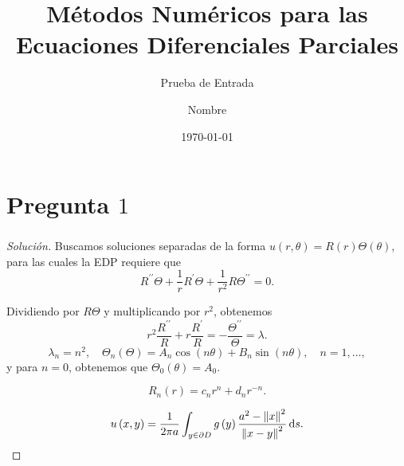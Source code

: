 \documentclass[aspectratio=1610,spanish,8pt]{beamer}
\title{Métodos Numéricos para las Ecuaciones Diferenciales Parciales} %
\subtitle{Prueba de Entrada}
\author{Nombre}
\institute{Universidad Nacional de Ingeniería}
\date{\today}
\begin{document}
\frame{\maketitle}

\section{Pregunta $1$}

\begin{frame}
    \frametitle{\secname}
    
\end{frame}

\begin{frame}
    \frametitle{\secname}

    \begin{proof}[Solución]
        Buscamos soluciones separadas de la forma
        \begin{math}
            u\left(r,\theta\right)=
            R\left(r\right)
            \Theta\left(\theta\right)
        \end{math},
        para las cuales la EDP requiere que
        \begin{equation*}
            R^{\prime\prime}\Theta+
            \frac{1}{r}
            R^{\prime}
            \Theta+
            \frac{1}{r^{2}}
            R\Theta^{\prime\prime}=
            0.
        \end{equation*}

        Dividiendo por $R\Theta$ y multiplicando por $r^{2}$,
        obtenemos
        \begin{equation*}
            r^{2}
            \frac{R^{\prime\prime}}{R}+
            r\frac{R^{\prime}}{R}=
            -\frac{\Theta^{\prime\prime}}{\Theta}=
            \lambda.
        \end{equation*}
        \begin{equation*}
            \lambda_{n}=n^{2},\quad
            \Theta_{n}\left(\Theta\right)=
            A_{n}
            \cos\left(n\theta\right)+
            B_{n}\sin\left(n\theta\right),\quad
            n=1,\dotsc,
        \end{equation*}
        y para $n=0$, obtenemos que $\Theta_{0}\left(\theta\right)=A_{0}$.

        \begin{equation*}
            R_{n}\left(r\right)=
            c_{n}r^{n}+
            d_{n}r^{-n}.
        \end{equation*}

        \begin{equation*}
            u\left(x,y\right)=
            \frac{1}{2\pi a}
            \int_{y\in\partial D}
            g\left(y\right)
            \frac{a^{2}-{\left\|x\right\|}^{2}}{{\left\|x-y\right\|}^{2}}\dl{s}.
        \end{equation*}
    \end{proof}
\end{frame}
\end{document}
